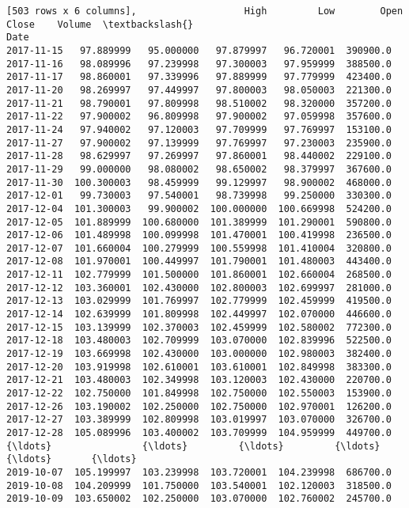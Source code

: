 \documentclass[11pt]{article}
\begin{document}
\begin{Verbatim}[commandchars=\\\{\}]
[503 rows x 6 columns],                   High         Low        Open       Close    Volume  \textbackslash{}
Date                                                                   
2017-11-15   97.889999   95.000000   97.879997   96.720001  390900.0   
2017-11-16   98.089996   97.239998   97.300003   97.959999  388500.0   
2017-11-17   98.860001   97.339996   97.889999   97.779999  423400.0   
2017-11-20   98.269997   97.449997   97.800003   98.050003  221300.0   
2017-11-21   98.790001   97.809998   98.510002   98.320000  357200.0   
2017-11-22   97.900002   96.809998   97.900002   97.059998  357600.0   
2017-11-24   97.940002   97.120003   97.709999   97.769997  153100.0   
2017-11-27   97.900002   97.139999   97.769997   97.230003  235900.0   
2017-11-28   98.629997   97.269997   97.860001   98.440002  229100.0   
2017-11-29   99.000000   98.080002   98.650002   98.379997  367600.0   
2017-11-30  100.300003   98.459999   99.129997   98.900002  468000.0   
2017-12-01   99.730003   97.540001   98.739998   99.250000  330300.0   
2017-12-04  101.300003   99.900002  100.000000  100.669998  524200.0   
2017-12-05  101.889999  100.680000  101.389999  101.290001  590800.0   
2017-12-06  101.489998  100.099998  101.470001  100.419998  236500.0   
2017-12-07  101.660004  100.279999  100.559998  101.410004  320800.0   
2017-12-08  101.970001  100.449997  101.790001  101.480003  443400.0   
2017-12-11  102.779999  101.500000  101.860001  102.660004  268500.0   
2017-12-12  103.360001  102.430000  102.800003  102.699997  281000.0   
2017-12-13  103.029999  101.769997  102.779999  102.459999  419500.0   
2017-12-14  102.639999  101.809998  102.449997  102.070000  446600.0   
2017-12-15  103.139999  102.370003  102.459999  102.580002  772300.0   
2017-12-18  103.480003  102.709999  103.070000  102.839996  522500.0   
2017-12-19  103.669998  102.430000  103.000000  102.980003  382400.0   
2017-12-20  103.919998  102.610001  103.610001  102.849998  383300.0   
2017-12-21  103.480003  102.349998  103.120003  102.430000  220700.0   
2017-12-22  102.750000  101.849998  102.750000  102.550003  153900.0   
2017-12-26  103.190002  102.250000  102.750000  102.970001  126200.0   
2017-12-27  103.389999  102.809998  103.019997  103.070000  326700.0   
2017-12-28  105.089996  103.400002  103.709999  104.959999  449700.0   
{\ldots}                {\ldots}         {\ldots}         {\ldots}         {\ldots}       {\ldots}   
2019-10-07  105.199997  103.239998  103.720001  104.239998  686700.0   
2019-10-08  104.209999  101.750000  103.540001  102.120003  318500.0   
2019-10-09  103.650002  102.250000  103.070000  102.760002  245700.0   

\end{Verbatim}
\end{document}
